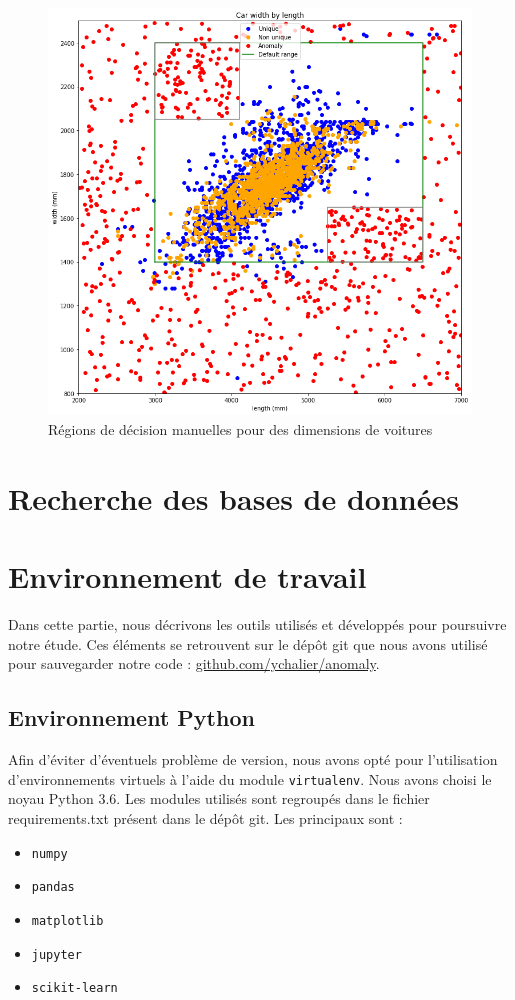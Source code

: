 \documentclass[a4paper]{report}
\begin{document}
\begin{figure}
\centering
\includegraphics[width=\textwidth]{img/first_try.png}
\caption{Régions de décision manuelles pour des dimensions de voitures\label{regions_decision_manuelles_plot}}
\end{figure}

\section{Recherche des bases de données}

\section{Environnement de travail}

Dans cette partie, nous décrivons les outils utilisés et développés pour poursuivre notre étude. Ces éléments se retrouvent sur le dépôt git que nous avons utilisé pour sauvegarder notre code : \href{https://github.com/ychalier/anomaly/}{github.com/ychalier/anomaly}.

\subsection{Environnement Python}

Afin d'éviter d'éventuels problème de version, nous avons opté pour l'utilisation d'environnements virtuels à l'aide du module \texttt{virtualenv}. Nous avons choisi le noyau Python 3.6. Les modules utilisés sont regroupés dans le fichier requirements.txt présent dans le dépôt git. Les principaux sont :
\begin{itemize}
\item \texttt{numpy}
\item \texttt{pandas}
\item \texttt{matplotlib}
\item \texttt{jupyter}
\item \texttt{scikit-learn}
\end{itemize}
\end{document}
